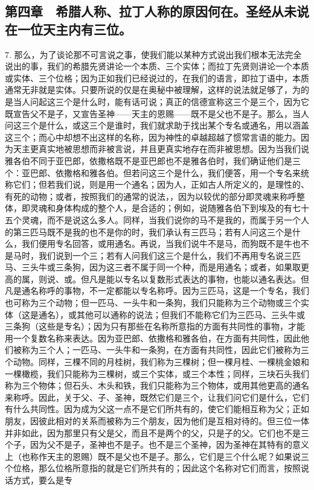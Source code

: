 
\subsection{第四章　希腊人称、拉丁人称的原因何在。圣经从未说在一位天主内有三位。}

7. 那么，为了谈论那不可言说之事，使我们能以某种方式说出我们根本无法完全说出的事，我们的希腊先贤讲论一个本质、三个实体；而拉丁先贤则讲论一个本质或实体、三个位格；因为正如我们已经说过的，在我们的语言，即拉丁语中，本质通常无非就是实体。只要所说的仅是在奥秘中被理解，这样的说法就足够了，为的是当人问起这三个是什么时，能有话可说；真正的信德宣称这三个是三个，因为它既宣告父不是子，又宣告圣神——天主的恩赐——既不是父也不是子。那么，当人问这三个是什么，或这三个是谁时，我们就求助于找出某个专名或通名，用以涵盖这三个；而心中却想不出这样的名称，因为神性的卓越超越了惯常言语的能力。因为天主更真实地被思想而非被言说，并且更真实地存在而非被思想。因为当我们说雅各伯不同于亚巴郎，依撒格既不是亚巴郎也不是雅各伯时，我们确证他们是三个：亚巴郎、依撒格和雅各伯。但若问这三个是什么，我们便答，用一个专名来统称它们；但若我们说，则是用一个通名；因为人，正如古人所定义的，是理性的、有死的动物；或者，按照我们的通常的说法，，因为以较优的部分即灵魂来称呼整体，即灵魂和身体构成的整个人，是合适的；例如，说随雅各伯下到埃及的有七十五个灵魂，而不是说这么多人。同样，当我们说你的马不是我的，而属于另一个人的第三匹马既不是我的也不是你的时，我们承认有三匹马；若有人问这三个是什么，我们便用专名回答，或用通名。再说，当我们说牛不是马，而狗既不是牛也不是马时，我们说到一个三；若有人问我们这三个是什么，我们不再用专名说三匹马、三头牛或三条狗，因为这三者不属于同一个种，而是用通名；或者，如果取更高的属，则说、或。但凡是能以专名以复数形式表达的事物，也能以通名表达。但凡是通名称呼的事物，不一定都能以专名称呼。因为三匹马，这是一个专名，我们也可称为三个动物；但一匹马、一头牛和一条狗，我们只能称为三个动物或三个实体（这是通名），或其他可以通称的说法；但我们不能称它们为三匹马、三头牛或三条狗（这些是专名）；因为只有那些在名称所意指的方面有共同性的事物，才能用一个复数名称来表达。因为亚巴郎、依撒格和雅各伯，在方面有共同性，因此他们被称为三个人；一匹马、一头牛和一条狗，在方面有共同性，因此它们被称为三个动物。同样，三棵不同的月桂树，我们称为三棵树；但一棵月桂、一棵桃金娘和一棵橄榄，我们只能称为三棵树，或三个实体，或三个本性；同样，三块石头我们称为三个物体；但石头、木头和铁，我们只能称为三个物体，或用其他更高的通名来称呼。因此，关于父、子、圣神，既然它们是三个，让我们问它们是什么，它们有什么共同性。因为成为父这一点不是它们所共有的，使它们能相互称为父；正如朋友，因彼此相对的关系而被称为三个朋友，因为他们是互相对待的。但三位一体并非如此，因为那里只有父是父，而且不是两个的父，只是子的父。它们也不是三个子，因为父不是子，圣神也不是子。也不是三个圣神，因为圣神在其特有的意义上（也称作天主的恩赐）既不是父也不是子。那么，它们是三个什么呢？如果说三个位格，那么位格所意指的就是它们所共有的；因此这个名称对它们而言，按照说话方式，要么是专